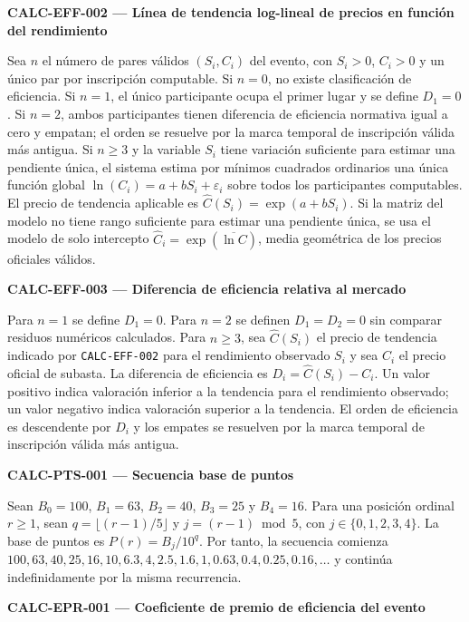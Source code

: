 \documentclass[10pt,letterpaper]{article}
\begin{document}
\noindent\textbf{CALC-EFF-002 --- Línea de tendencia log-lineal de precios en función del rendimiento}\par
Sea $n$ el número de pares válidos $(S_i,C_i)$ del evento, con $S_i>0$, $C_i>0$ y un único par por inscripción computable. Si $n=0$, no existe clasificación de eficiencia. Si $n=1$, el único participante ocupa el primer lugar y se define $D_1=0$. Si $n=2$, ambos participantes tienen diferencia de eficiencia normativa igual a cero y empatan; el orden se resuelve por la marca temporal de inscripción válida más antigua. Si $n\ge3$ y la variable $S_i$ tiene variación suficiente para estimar una pendiente única, el sistema estima por mínimos cuadrados ordinarios una única función global $\ln(C_i)=a+bS_i+\varepsilon_i$ sobre todos los participantes computables. El precio de tendencia aplicable es $\widehat{C}(S_i)=\exp(a+bS_i)$. Si la matriz del modelo no tiene rango suficiente para estimar una pendiente única, se usa el modelo de solo intercepto $\widehat{C}_i=\exp(\overline{\ln C})$, media geométrica de los precios oficiales válidos.\par\vspace{0.5em}
\noindent\textbf{CALC-EFF-003 --- Diferencia de eficiencia relativa al mercado}\par
Para $n=1$ se define $D_1=0$. Para $n=2$ se definen $D_1=D_2=0$ sin comparar residuos numéricos calculados. Para $n\ge3$, sea $\widehat{C}(S_i)$ el precio de tendencia indicado por \texttt{CALC-EFF-002} para el rendimiento observado $S_i$ y sea $C_i$ el precio oficial de subasta. La diferencia de eficiencia es $D_i=\widehat{C}(S_i)-C_i$. Un valor positivo indica valoración inferior a la tendencia para el rendimiento observado; un valor negativo indica valoración superior a la tendencia. El orden de eficiencia es descendente por $D_i$ y los empates se resuelven por la marca temporal de inscripción válida más antigua.\par\vspace{0.5em}
\noindent\textbf{CALC-PTS-001 --- Secuencia base de puntos}\par
Sean $B_0=100$, $B_1=63$, $B_2=40$, $B_3=25$ y $B_4=16$. Para una posición ordinal $r\ge1$, sean $q=\lfloor(r-1)/5\rfloor$ y $j=(r-1)\bmod5$, con $j\in\{0,1,2,3,4\}$. La base de puntos es $P(r)=B_j/10^q$. Por tanto, la secuencia comienza $100,63,40,25,16,10,6.3,4,2.5,1.6,1,0.63,0.4,0.25,0.16,\ldots$ y continúa indefinidamente por la misma recurrencia.\par\vspace{0.5em}
\noindent\textbf{CALC-EPR-001 --- Coeficiente de premio de eficiencia del evento}\par
\end{document}
